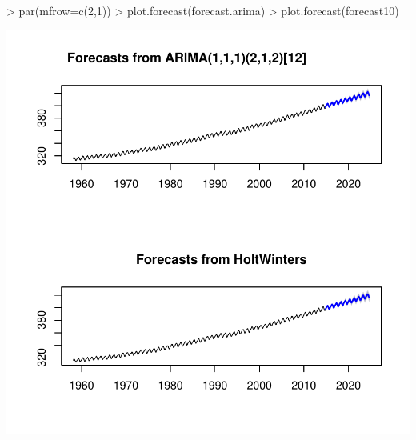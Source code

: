 \documentclass[11pt, a4paper]{article} %
\begin{document}
\begin{Schunk}
\begin{Sinput}
> par(mfrow=c(2,1))
> plot.forecast(forecast.arima)
> plot.forecast(forecast10)
\end{Sinput}
\end{Schunk}
\includegraphics{alleselena-066}
\end{document}
